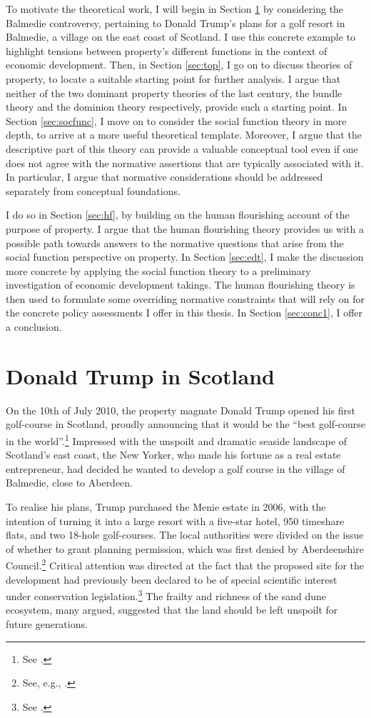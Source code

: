 To motivate the theoretical work, I will begin in Section \ref{sec:dts} by considering the Balmedie controversy, pertaining to Donald Trump's plans for a golf resort in Balmedie, a village on the east coast of Scotland. I use this concrete example to highlight tensions between property's different functions in the context of economic development. Then, in Section \ref{sec:top}, I go on to discuss theories of property, to locate a suitable starting point for further analysis. I argue that neither of the two dominant property theories of the last century, the bundle theory and the dominion theory respectively, provide such a starting point. In Section \ref{sec:socfunc}, I move on to consider the social function theory in more depth, to arrive at a more useful theoretical template. Moreover, I argue that the descriptive part of this theory can provide a valuable conceptual tool even if one does not agree with the normative assertions that are typically associated with it. In particular, I argue that normative considerations should be addressed separately from conceptual foundations.

I do so in Section \ref{sec:hf}, by building on the human flourishing account of the purpose of property. I argue that the human flourishing theory provides us with a possible path towards answers to the normative questions that arise from the social function perspective on property. In Section \ref{sec:edt}, I make the discussion more concrete by applying the social function theory to a preliminary investigation of economic development takings. The human flourishing theory is then used to formulate some overriding normative constraints that will rely on for the concrete policy assessments I offer in this thesis. In Section \ref{sec:conc1}, I offer a conclusion.

\section{Donald Trump in Scotland}\label{sec:dts}

On the 10th of July 2010, the property magnate Donald Trump opened his first golf-course in Scotland, proudly announcing that it would be the ``best golf-course in the world''.\footnote{See \cite{passow12}.} Impressed with the unspoilt and dramatic seaside landscape of Scotland's east coast, the New Yorker, who made his fortune as a real estate entrepreneur, had decided he wanted to develop a golf course in the village of Balmedie, close to Aberdeen.

To realise his plans, Trump purchased the Menie estate in 2006, with the intention of turning it into a large resort with a five-star hotel, 950 timeshare flats, and two 18-hole golf-courses. The local authorities were divided on the issue of whether to grant planning permission, which was first denied by Aberdeenshire Council.\footnote{See, e.g., \cite{bbc07}.} Critical attention was directed at the fact that the proposed site for the development had previously been declared to be of special scientific interest under conservation legislation.\footnote{See \cite{bbc07b}.} The frailty and richness of the sand dune ecosystem, many argued, suggested that the land should be left unspoilt for future generations. 

